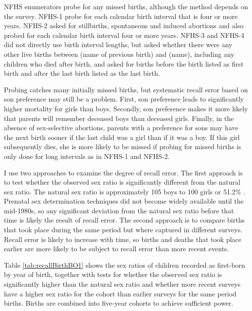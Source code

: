 \documentclass[12pt,letterpaper]{article}
\begin{document}
NFHS enumerators probe for any missed births, although the method depends on the survey.
NFHS-1 probe for each calendar birth interval that is four or more years.
NFHS-2 asked for stillbirths, spontaneous and induced abortions and also probed 
for each calendar birth interval four or more years.
NFHS-3 and NFHS-4 did not directly use birth interval lengths, but asked whether there were any 
other live births between (name of previous birth) and (name), including any children who 
died after birth, and asked for births before the birth listed as first birth and
after the last birth listed as the last birth.

Probing catches many initially missed births, but systematic recall error based on son
preference may still be a problem.
First, son preference leads to significantly higher mortality for girls than boys.
Secondly, son preference makes it more likely that parents will remember deceased boys 
than deceased girls.
Finally, in the absence of sex-selective abortions, parents with a preference for sons may
have the next birth sooner if the last child was a girl than if it was a boy.
If this girl subsequently dies, she is more likely to be missed if probing for missed 
births is only done for long intervals as in NFHS-1 and NFHS-2.

I use two approaches to examine the degree of recall error.
The first approach is to test whether the observed sex ratio is significantly different
from the natural sex ratio.
The natural sex ratio is approximately 105 boys to 100 girls or
51.2\% \citep{ben-porath76b,jacobsen99,Portner2015b}.
Prenatal sex determination techniques did not become widely available until the mid-1980s, 
so any significant deviation from the natural sex ratio before that time is likely the 
result of recall error.
The second approach is to compare births that took place during the same period but
where captured in different surveys.
Recall error is likely to increase with time, so births and deaths that took place earlier 
are more likely to be subject to recall error than more recent events.

Table \ref{tab:recallBirthBO1} shows the sex ratios of children recorded as first-born by 
year of birth, together with tests for whether the observed sex ratio is significantly 
higher than the natural sex ratio and whether more recent surveys have a higher sex ratio 
for the cohort than earlier surveys for the same period births.
Births are combined into five-year cohorts to achieve sufficient power.
\end{document}
